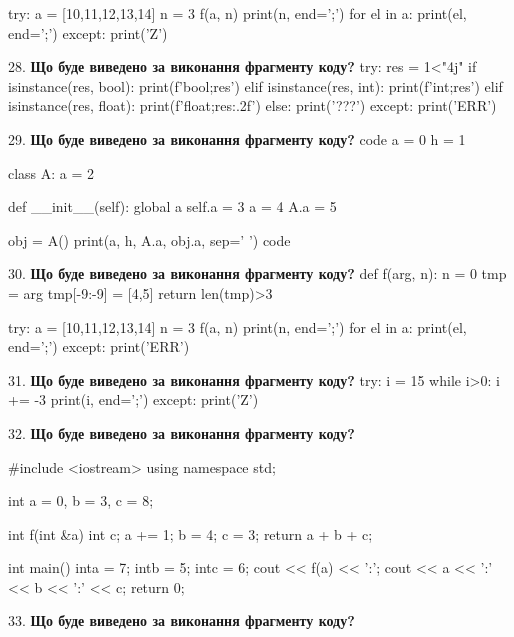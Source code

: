 \documentclass[11pt]{article}
\begin{document}
try:
    a = [10,11,12,13,14]
    n = 3
    f(a, n)
    print(n, end=';')
    for el in a:
        print(el, end=';')
except:
    print('Z')
\par\vspace{5mm}
28. \textbf{Що буде виведено за виконання фрагменту коду?}
try:
    res = 1<"4j"
    if isinstance(res, bool):
        print(f'bool;{res}')
    elif isinstance(res, int):
        print(f'int;{res}')
    elif isinstance(res, float):
        print(f'float;{res:.2f}')
    else:
        print('???')
except:
    print('ERR')
\par\vspace{5mm}
29. \textbf{Що буде виведено за виконання фрагменту коду?}
code
a = 0
h = 1

class A:
    a = 2
    
    def __init__(self):
global a        self.a = 3
        a = 4
        A.a = 5

obj = A()
print(a, h, A.a, obj.a, sep=' ')
code
\par\vspace{5mm}
30. \textbf{Що буде виведено за виконання фрагменту коду?}
def f(arg, n):
    n = 0
    tmp = arg
    tmp[-9:-9] = [4,5]
    return len(tmp)>3

try:
    a = [10,11,12,13,14]
    n = 3
    f(a, n)
    print(n, end=';')
    for el in a:
        print(el, end=';')
except:
    print('ERR')
\par\vspace{5mm}
31. \textbf{Що буде виведено за виконання фрагменту коду?}
try:
    i = 15
    while i>0:
        i += -3
    print(i, end=';')
except:
    print('Z')
\par\vspace{5mm}
32. \textbf{Що буде виведено за виконання фрагменту коду?}

#include <iostream>
using namespace std;

int a = 0, b = 3, c = 8;

int f(int &a){
int c;    a += 1;
    b = 4;
    c = 3;
    return a + b + c;
}

int main(){
    inta = 7;
    intb = 5;
    intc = 6;
    cout << f(a) << ':';
    cout << a << ':' << b << ':' << c;
    return 0; 
}
\par\vspace{5mm}
33. \textbf{Що буде виведено за виконання фрагменту коду?}
\end{document}
